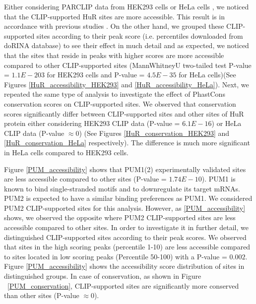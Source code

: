 Either considering PARCLIP data from HEK293 cells \cite{hafner_10} or HeLa cells \cite{lebedeva_11}, we noticed that the CLIP-supported HuR sites are more accessible. This result is in accordance with previous studies \cite{hur_accessibility}. On the other hand, we grouped these CLIP-supported sites according to their peak score (i.e. percentiles downloaded from doRINA database) to see their effect in much detail and as expected, we noticed that the sites that reside in peaks with higher scores are more accessible compared to other CLIP-supported sites (MannWhitneyU two-tailed test P-value = $1.1E-203$ for HEK293 cells and P-value = $4.5E-35$ for HeLa cells)(See Figures \ref{HuR_accessibility_HEK293} and \ref{HuR_accessibility_HeLa}). Next, we repeated the same type of analysis to investigate the effect of PhastCons conservation scores on CLIP-supported sites. We observed that conservation scores significantly differ between CLIP-supported sites and other sites of HuR protein either considering HEK293 CLIP data (P-value = $6.1E-16$) or HeLa CLIP data (P-value $\approx 0$) (See Figures \ref{HuR_conservation_HEK293} and \ref{HuR_conservation_HeLa} respectively). The difference is much more significant in HeLa cells compared to HEK293 cells.

Figure \ref{PUM_accessibility} shows that PUM1(2) experimentally validated sites are less accessible compared to other sites (P-value = $1.74E-10$). PUM1 is known to bind single-stranded motifs \cite{wang_02} and to downregulate its target mRNAs. PUM2 is expected to have a similar binding preferences as PUM1. We considered PUM2 CLIP-supported sites for this analysis. However, as \ref{PUM_accessibility} shows, we observed the opposite where PUM2 CLIP-supported sites are less accessible compared to other sites. In order to investigate it in further detail, we distinguished CLIP-supported sites according to their peak scores. We observed that sites in the high scoring peaks (percentile 1-10) are less accessible compared to sites located in low scoring peaks (Percentile 50-100) with a P-value = $0.002$. Figure \ref{PUM_accessibility} shows the accessibility score distribution of sites in distinguished groups. In case of conservation, as shown in Figure ~\ref{PUM_conservation}, CLIP-supported sites are significantly more conserved than other sites (P-value $\approx 0$).

